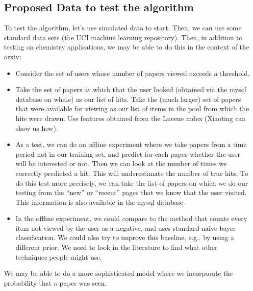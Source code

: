 \documentclass[12pt]{article}
\begin{document}
\subsection{Proposed Data to test the algorithm}

To test the algorithm, let's use simulated data to start.  Then, we can use some standard data sets (the UCI machine learning repository).  Then, in addition to testing on chemistry applications, we may be able to do this in the context of the arxiv:

\begin{itemize}
\item Consider the set of users whose number of papers viewed exceeds a threshold.
\item Take the set of papers at which that the user looked (obtained via the mysql database on whale) as our list of hits.  Take the (much larger) set of papers that were available for viewing as our list of items in the pool from which the hits were drawn.  Use features obtained from the Lucene index (Xiaoting can show us how).
\item As a test, we can do an offline experiment where we take papers from a time period not in our training set, and predict for each paper whether the user will be interested or not.  Then we can look at the number of times we correctly predicted a hit.  This will underestimate the number of true hits.  To do this test more precisely, we can take the list of papers on which we do our testing from the ``new'' or ``recent'' pages that we know that the user visited.  This information is also available in the mysql database.   
\item In the offline experiment, we could compare to the method that counts every item not viewed by the user as a negative, and uses standard naive bayes classification.  We could also try to improve this baseline, e.g., by using a different prior.  We need to look in the literature to find what other techniques people might use.
\end{itemize}

We may be able to do a more sophisticated model where we incorporate the probability that a paper was seen.
\end{document}
